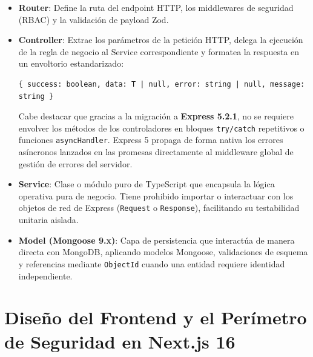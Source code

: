 \begin{itemize}
    \item \textbf{Router}: Define la ruta del endpoint HTTP, los middlewares de seguridad (RBAC) y la validación de payload Zod.
    \item \textbf{Controller}: Extrae los parámetros de la petición HTTP, delega la ejecución de la regla de negocio al Service correspondiente y formatea la respuesta en un envoltorio estandarizado:
    \begin{lstlisting}[caption={Estructura estándar de respuesta API}, label={lst:api-response}]
{ success: boolean, data: T | null, error: string | null, message: string }
\end{lstlisting}
    Cabe destacar que gracias a la migración a \textbf{Express 5.2.1}, no se requiere envolver los métodos de los controladores en bloques \texttt{try/catch} repetitivos o funciones \texttt{asyncHandler}. Express 5 propaga de forma nativa los errores asíncronos lanzados en las promesas directamente al middleware global de gestión de errores del servidor.
    \item \textbf{Service}: Clase o módulo puro de TypeScript que encapsula la lógica operativa pura de negocio. Tiene prohibido importar o interactuar con los objetos de red de Express (\texttt{Request} o \texttt{Response}), facilitando su testabilidad unitaria aislada.
    \item \textbf{Model (Mongoose 9.x)}: Capa de persistencia que interactúa de manera directa con MongoDB, aplicando modelos Mongoose, validaciones de esquema y referencias mediante \texttt{ObjectId} cuando una entidad requiere identidad independiente.
\end{itemize}

\section{Diseño del Frontend y el Perímetro de Seguridad en Next.js 16}

